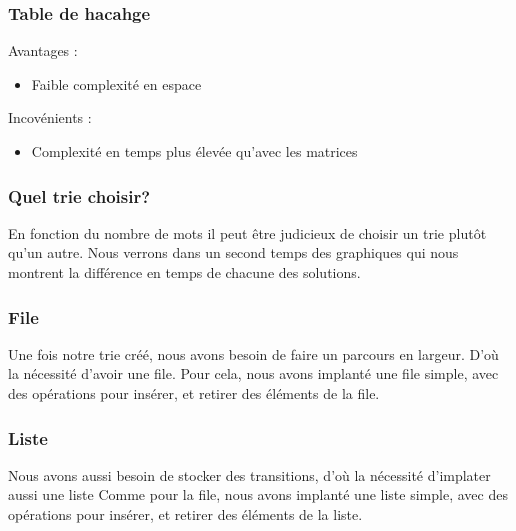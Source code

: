 \documentclass{beamer}
\begin{document}
  \begin{frame}
    \frametitle{Table de hacahge}
    Avantages :
    \begin{itemize}
      \item Faible complexité en espace
    \end{itemize}
    Incovénients :
    \begin{itemize}
      \item Complexité en temps plus élevée qu'avec les matrices
    \end{itemize}
  \end{frame}

  \begin{frame}
    \frametitle{Quel trie choisir?}

    En fonction du nombre de mots il peut être judicieux de 
    choisir un trie plutôt qu'un autre.
    \newline
    \newline
    Nous verrons dans un second temps des graphiques qui nous 
    montrent la différence en temps de chacune des solutions.
  \end{frame}

  \begin{frame}
    \frametitle{File}

    Une fois notre trie créé, nous avons besoin de faire un parcours en largeur.
    D'où la nécessité d'avoir une file.
    \newline
    \newline
    Pour cela, nous avons implanté une file simple, avec des opérations pour
    insérer, et retirer des éléments de la file.

  \end{frame}

  \begin{frame}
    \frametitle{Liste}

    Nous avons aussi besoin de stocker des transitions, 
    d'où la nécessité d'implater aussi une liste
    \newline
    \newline
    Comme pour la file, nous avons implanté une liste simple, 
    avec des opérations pour insérer, et retirer des éléments de la liste.

  \end{frame}
\end{document}
